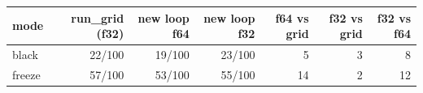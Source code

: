 \begin{tabular}{lrrrrrr}
\toprule
mode & run\_grid (f32) & new loop f64 & new loop f32 & f64 vs grid & f32 vs grid & f32 vs f64 \\
\midrule
black & 22/100 & 19/100 & 23/100 & 5 & 3 & 8 \\
freeze & 57/100 & 53/100 & 55/100 & 14 & 2 & 12 \\
\bottomrule
\end{tabular}
